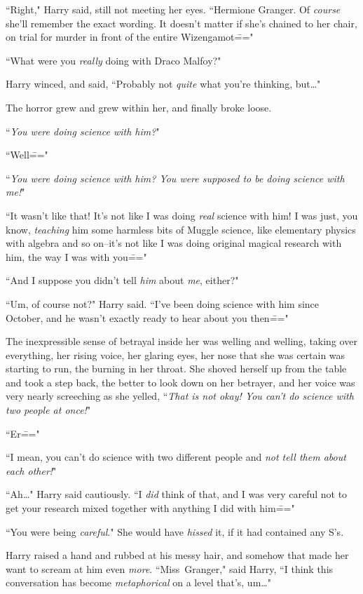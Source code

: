 ``Right," Harry said, still not meeting her eyes. ``Hermione Granger. Of \emph{course} she'll remember the exact wording. It doesn't matter if she's chained to her chair, on trial for murder in front of the entire Wizengamot\==="

``What were you \emph{really} doing with Draco Malfoy?"

Harry winced, and said, ``Probably not \emph{quite} what you're thinking, but{\ldots}"

The horror grew and grew within her, and finally broke loose.

``\emph{You were doing \emph{science} with him?}"

``Well\==="

``\emph{You were doing \emph{science} with him? You were supposed to be doing science with \emph{me}!}"

``It wasn't like that! It's not like I was doing \emph{real} science with him! I was just, you know, \emph{teaching} him some harmless bits of Muggle science, like elementary physics with algebra and so on\---it's not like I was doing original magical research with him, the way I was with you\==="

``And I suppose you didn't tell \emph{him} about \emph{me}, either?"

``Um, of course not?" Harry said. ``I've been doing science with him since October, and he wasn't exactly ready to hear about you then\==="

The inexpressible sense of betrayal inside her was welling and welling, taking over everything, her rising voice, her glaring eyes, her nose that she was certain was starting to run, the burning in her throat. She shoved herself up from the table and took a step back, the better to look down on her betrayer, and her voice was very nearly screeching as she yelled, ``\emph{That is not okay! You can't do science with two people at once!}"

``Er\==="

``I mean, you can't do science with two different people and \emph{not tell them about each other!}"

``Ah{\ldots}" Harry said cautiously. ``I \emph{did} think of that, and I was very careful not to get your research mixed together with anything I did with him\==="

``You were being \emph{careful}." She would have \emph{hissed} it, if it had contained any S's.

Harry raised a hand and rubbed at his messy hair, and somehow that made her want to scream at him even \emph{more}. ``Miss~Granger," said Harry, ``I think this conversation has become \emph{metaphorical} on a level that's, um{\ldots}"

